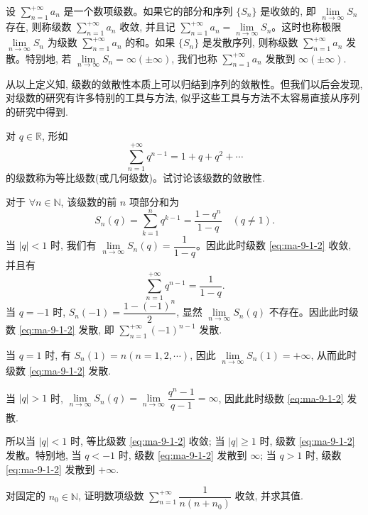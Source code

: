 \begin{definition}\label{definition:ma-9-1-1}
设 $\sum\limits_{n=1}^{+\infty}a_n$ 是一个数项级数。如果它的部分和序列 $\{S_n\}$ 是收敛的, 即 $\lim\limits_{n\to\infty}S_n$ 存在, 则称级数 $\sum\limits_{n=1}^{+\infty}a_n$ 收敛, 并且记 $\sum\limits_{n=1}^{+\infty}a_n=\lim\limits_{n\to\infty}S_n$。这时也称极限 $\lim\limits_{n\to\infty}S_n$ 为级数 $\sum\limits_{n=1}^{+\infty}a_n$ 的和。如果 $\{S_n\}$ 是发散序列, 则称级数 $\sum\limits_{n=1}^{+\infty}a_n$ 发散。特别地, 若 $\lim\limits_{n\to\infty}S_n=\infty(\pm\infty)$, 我们也称 $\sum\limits_{n=1}^{+\infty}a_n$ 发散到 $\infty(\pm\infty)$.
\end{definition}

从以上定义知, 级数的敛散性本质上可以归结到序列的敛散性。但我们以后会发现, 对级数的研究有许多特别的工具与方法, 似乎这些工具与方法不太容易直接从序列的研究中得到.

\begin{example}\label{example:ma-9-1-1}
对 $q\in\mathbb R$, 形如
\begin{equation}
  \sum_{n=1}^{+\infty}q^{n-1}=1+q+q^2+\cdots
  \label{eq:ma-9-1-2}
\end{equation}
的级数称为等比级数(或几何级数)。试讨论该级数的敛散性.
\end{example}


\begin{solve}
对于 $\forall n\in\mathbb N$, 该级数的前 $n$ 项部分和为
\[
  S_n(q)=\sum_{k=1}^n q^{k-1}=\frac{1-q^n}{1-q}\quad(q\neq1).
\]
当 $|q|<1$ 时, 我们有 $\lim\limits_{n\to\infty}S_n(q)=\dfrac1{1-q}$。因此此时级数 \eqref{eq:ma-9-1-2} 收敛, 并且有
\[
  \sum_{n=1}^{+\infty}q^{n-1}=\frac1{1-q}.
\]
当 $q=-1$ 时, $S_n(-1)=\dfrac{1-(-1)^n}{2}$, 显然 $\lim\limits_{n\to\infty}S_n(q)$ 不存在。因此此时级数 \eqref{eq:ma-9-1-2} 发散, 即 $\sum\limits_{n=1}^{+\infty}(-1)^{n-1}$ 发散.

当 $q=1$ 时, 有 $S_n(1)=n(n=1,2,\cdots)$, 因此 $\lim\limits_{n\to\infty}S_n(1)=+\infty$, 从而此时级数 \eqref{eq:ma-9-1-2} 发散.

当 $|q|>1$ 时, $\lim\limits_{n\to\infty}S_n(q)=\lim\limits_{n\to\infty}\dfrac{q^n-1}{q-1}=\infty$, 因此此时级数 \eqref{eq:ma-9-1-2} 发散.

所以当 $|q|<1$ 时, 等比级数 \eqref{eq:ma-9-1-2} 收敛; 当 $|q|\geq1$ 时, 级数 \eqref{eq:ma-9-1-2} 发散。特别地, 当 $q<-1$ 时, 级数 \eqref{eq:ma-9-1-2} 发散到 $\infty$; 当 $q>1$ 时, 级数 \eqref{eq:ma-9-1-2} 发散到 $+\infty$.
\end{solve}


\begin{example}\label{example:ma-9-1-2}
对固定的 $n_0\in\mathbb N$, 证明数项级数 $\sum\limits_{n=1}^{+\infty}\dfrac1{n(n+n_0)}$ 收敛, 并求其值.
\end{example}



